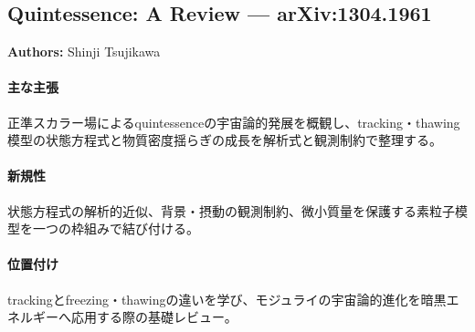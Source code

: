 \subsection{Quintessence: A Review --- arXiv:1304.1961}

\textbf{Authors:} Shinji Tsujikawa

\paragraph{主な主張}
正準スカラー場によるquintessenceの宇宙論的発展を概観し、tracking・thawing模型の状態方程式と物質密度揺らぎの成長を解析式と観測制約で整理する\cite{Tsujikawa:2013fta}。

\paragraph{新規性}
状態方程式の解析的近似、背景・摂動の観測制約、微小質量を保護する素粒子模型を一つの枠組みで結び付ける。

\paragraph{位置付け}
trackingとfreezing・thawingの違いを学び、モジュライの宇宙論的進化を暗黒エネルギーへ応用する際の基礎レビュー。
